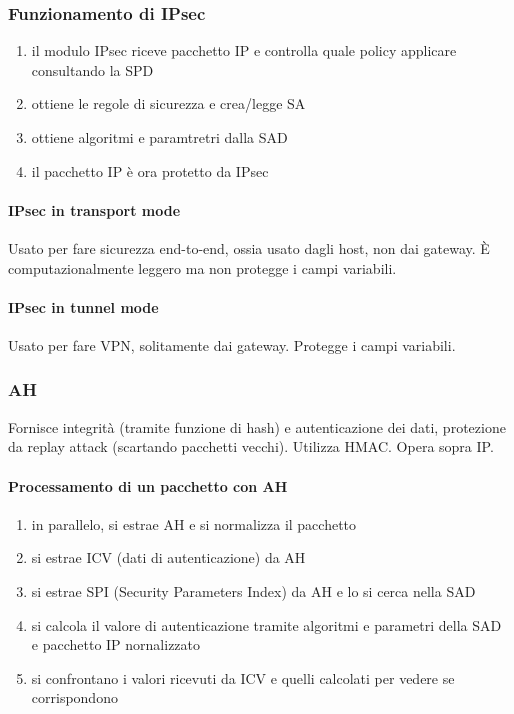 \documentclass[11pt]{article}
\begin{document}
\subsubsection{Funzionamento di IPsec}
\begin{enumerate}
    \item il modulo IPsec riceve pacchetto IP e controlla quale policy applicare consultando la SPD 
    \item ottiene le regole di sicurezza e crea/legge SA 
    \item ottiene algoritmi e paramtretri dalla SAD 
    \item il pacchetto IP è ora protetto da IPsec
\end{enumerate}
\paragraph*{IPsec in transport mode}
Usato per fare sicurezza end-to-end, ossia usato dagli host, non dai gateway. È computazionalmente leggero ma non protegge 
i campi variabili.
\paragraph*{IPsec in tunnel mode}
Usato per fare VPN, solitamente dai gateway. Protegge i campi variabili.
\subsubsection{AH}
Fornisce integrità (tramite funzione di hash) e autenticazione dei dati, protezione da replay attack (scartando pacchetti 
vecchi). Utilizza HMAC. Opera sopra IP.
\paragraph*{Processamento di un pacchetto con AH}
\begin{enumerate}
    \item in parallelo, si estrae AH e si normalizza il pacchetto 
    \item si estrae ICV (dati di autenticazione) da AH
    \item si estrae SPI (Security Parameters Index) da AH e lo si cerca nella SAD
    \item si calcola il valore di autenticazione tramite algoritmi e parametri della SAD e pacchetto IP nornalizzato 
    \item si confrontano i valori ricevuti da ICV e quelli calcolati per vedere se corrispondono
\end{enumerate}
\end{document}
